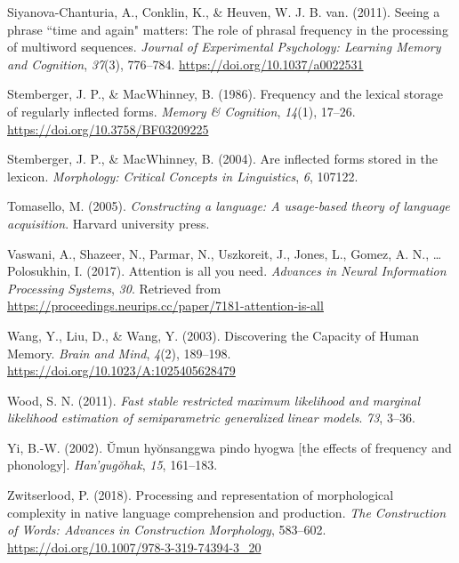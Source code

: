 \documentclass[
  man,floatsintext]{apa6}
\newlength{\cslhangindent}
\newenvironment{CSLReferences}[2] %
 {\begin{list}{}{%
  \setlength{\itemindent}{0pt}
  \setlength{\leftmargin}{0pt}
  \setlength{\parsep}{0pt}
  \ifodd #1
   \setlength{\leftmargin}{\cslhangindent}
   \setlength{\itemindent}{-1\cslhangindent}
  \fi
  \setlength{\itemsep}{#2\baselineskip}}}
 {\end{list}}
\begin{document}
\begin{CSLReferences}{1}{0}
Siyanova-Chanturia, A., Conklin, K., \& Heuven, W. J. B. van. (2011). Seeing a phrase {``}time and again{"} matters: The role of phrasal frequency in the processing of multiword sequences. \emph{Journal of Experimental Psychology: Learning Memory and Cognition}, \emph{37}(3), 776--784. \url{https://doi.org/10.1037/a0022531}

Stemberger, J. P., \& MacWhinney, B. (1986). Frequency and the lexical storage of regularly inflected forms. \emph{Memory \& Cognition}, \emph{14}(1), 17--26. \url{https://doi.org/10.3758/BF03209225}

Stemberger, J. P., \& MacWhinney, B. (2004). Are inflected forms stored in the lexicon. \emph{Morphology: Critical Concepts in Linguistics}, \emph{6}, 107122.

Tomasello, M. (2005). \emph{Constructing a language: A usage-based theory of language acquisition}. Harvard university press.

Vaswani, A., Shazeer, N., Parmar, N., Uszkoreit, J., Jones, L., Gomez, A. N., \ldots{} Polosukhin, I. (2017). Attention is all you need. \emph{Advances in Neural Information Processing Systems}, \emph{30}. Retrieved from \url{https://proceedings.neurips.cc/paper/7181-attention-is-all}

Wang, Y., Liu, D., \& Wang, Y. (2003). Discovering the Capacity of Human Memory. \emph{Brain and Mind}, \emph{4}(2), 189--198. \url{https://doi.org/10.1023/A:1025405628479}

Wood, S. N. (2011). \emph{Fast stable restricted maximum likelihood and marginal likelihood estimation of semiparametric generalized linear models}. \emph{73}, 3--36.

Yi, B.-W. (2002). Ŭmun hyŏnsanggwa pindo hyogwa {[}the effects of frequency and phonology{]}. \emph{Han'gugŏhak}, \emph{15}, 161--183.

Zwitserlood, P. (2018). Processing and representation of morphological complexity in native language comprehension and production. \emph{The Construction of Words: Advances in Construction Morphology}, 583--602. \url{https://doi.org/10.1007/978-3-319-74394-3_20}

\end{CSLReferences}
\end{document}
